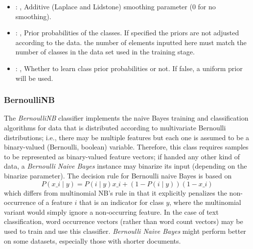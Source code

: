 \begin{itemize}
    \item {}: , 
      Additive (Laplace and Lidstone) smoothing parameter (0 for no smoothing).

    \item {}: , 
      Prior probabilities of the classes. If specified the priors are
      not adjusted according to the data. \nb the number of elements inputted here must
      match the number of classes in the data set used in the training stage.

    \item {}: , 
      Whether to learn class prior probabilities or not. If false, a uniform
      prior will be used.
  \end{itemize}


\subsubsection{BernoulliNB}
  The \textit{BernoulliNB} classifier implements the naive Bayes training and
  classification algorithms for data that is distributed according to multivariate
  Bernoulli distributions; i.e., there may be multiple features but each one is
  assumed to be a binary-valued (Bernoulli, boolean) variable.                          Therefore,
  this class requires samples to be represented as binary-valued                          feature
  vectors; if handed any other kind of data, a \textit{Bernoulli Naive
  Bayes} instance may binarize its input (depending on the binarize parameter).
  The decision rule for Bernoulli naive Bayes is based on                          \begin{equation}
  P(x\_i \mid y) = P(i \mid y) x\_i + (1 - P(i \mid y)) (1 - x\_i)
  \end{equation}                          which differs from multinomial NB's rule in that it
  explicitly penalizes the                          non-occurrence of a feature $i$ that is an
  indicator for class $y$, where the                          multinomial variant would simply
  ignore a non-occurring feature.                          In the case of text classification, word
  occurrence vectors (rather than word                          count vectors) may be used to train
  and use this classifier.                          \textit{Bernoulli Naive Bayes} might perform
  better on some datasets, especially                          those with shorter documents.


